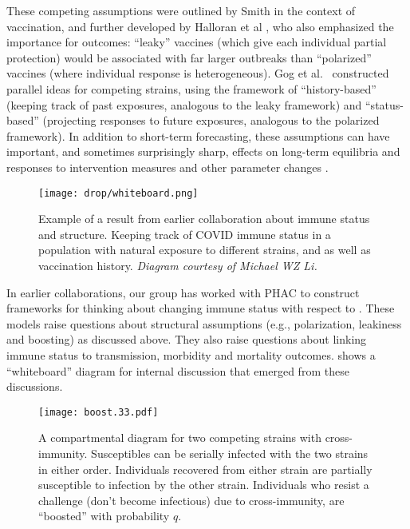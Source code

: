 These competing assumptions were outlined by Smith \cite{smith1984assessment} in the context of vaccination, and further developed by Halloran et al \cite{ halloran1991direct,halloran1992interpretation}, who also emphasized the importance for outcomes: “leaky” vaccines (which give each individual partial protection) would be associated with far larger outbreaks than “polarized” vaccines (where individual response is heterogeneous). Gog et al.~\cite{gog2002dynamics,gog2002status} constructed parallel ideas for competing strains, using the framework of “history-based” (keeping track of past exposures, analogous to the leaky framework) and “status-based” (projecting responses to future exposures, analogous to the polarized framework). In addition to short-term forecasting, these assumptions can have important, and sometimes surprisingly sharp, effects on long-term equilibria and responses to intervention measures and other parameter changes \cite{gomes2014missing}.


\begin{figure}
\texttt{[image: drop/whiteboard.png]}

\caption{
	Example of a result from earlier collaboration about immune status and
	structure. Keeping track of COVID immune status in a population with natural exposure to different strains, and as well as vaccination history.
	\emph{Diagram courtesy of Michael WZ Li.}
}
\end{figure}

In earlier collaborations, our group has worked with PHAC to construct frameworks for thinking about changing immune status with respect to \scv. These models raise questions about structural assumptions (e.g., polarization, leakiness and boosting) as discussed above. They also raise questions about linking immune status to transmission, morbidity and mortality outcomes.  shows a “whiteboard” diagram for internal discussion that emerged from these discussions.

\begin{figure}
\texttt{[image: boost.33.pdf]}

\caption{
	A compartmental diagram for two competing strains with cross-immunity. Susceptibles can be serially infected with the two strains in either order. Individuals recovered from either strain are partially susceptible to infection by the other strain. Individuals who resist a challenge (don't become infectious) due to cross-immunity, are “boosted” with probability $q$.
}
\end{figure}

